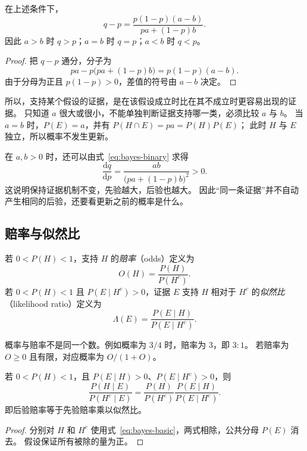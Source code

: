 \documentclass[UTF8,12pt,a4paper,fontset=fandol]{ctexart}
\begin{document}
\begin{proposition}[概率更新的方向]
\label{prop:bayes-direction}
在上述条件下，
\begin{equation}
  q-p=\frac{p(1-p)(a-b)}{pa+(1-p)b}.
  \label{eq:bayes-direction}
\end{equation}
因此 $a>b$ 时 $q>p$；$a=b$ 时 $q=p$；$a<b$ 时 $q<p$。
\end{proposition}
\begin{proof}
把 $q-p$ 通分，分子为
\[
  pa-p\bigl(pa+(1-p)b\bigr)=p(1-p)(a-b).
\]
由于分母为正且 $p(1-p)>0$，差值的符号由 $a-b$ 决定。
\end{proof}

所以，支持某个假设的证据，是在该假设成立时比在其不成立时更容易出现的证据。
只知道 $a$ 很大或很小，不能单独判断证据支持哪一类，必须比较 $a$ 与 $b$。
当 $a=b$ 时，$P(E)=a$，并有 $P(H\cap E)=pa=P(H)P(E)$；
此时 $H$ 与 $E$ 独立，所以概率不发生更新。

在 $a,b>0$ 时，还可以由式~\eqref{eq:bayes-binary} 求得
\[
  \frac{\mathrm dq}{\mathrm dp}
  =\frac{ab}{\bigl(pa+(1-p)b\bigr)^2}>0.
\]
这说明保持证据机制不变，先验越大，后验也越大。
因此“同一条证据”并不自动产生相同的后验，还要看更新之前的概率是什么。

\subsection{赔率与似然比}

\begin{definition}[赔率与似然比]
若 $0<P(H)<1$，支持 $H$ 的\emph{赔率}（odds）定义为
\[
  O(H)=\frac{P(H)}{P(H^c)}.
\]
若 $0<P(H)<1$ 且 $P(E\mid H^c)>0$，证据 $E$ 支持 $H$ 相对于 $H^c$ 的\emph{似然比}（likelihood ratio）定义为
\[
  \Lambda(E)=\frac{P(E\mid H)}{P(E\mid H^c)}.
\]
\end{definition}

概率与赔率不是同一个数。例如概率为 $3/4$ 时，赔率为 $3$，即 $3:1$。
若赔率为 $O\geq0$ 且有限，对应概率为 $O/(1+O)$。

\begin{theorem}[贝叶斯公式的赔率形式]
\label{thm:bayes-odds}
若 $0<P(H)<1$，且 $P(E\mid H)>0$、$P(E\mid H^c)>0$，则
\begin{equation}
  \frac{P(H\mid E)}{P(H^c\mid E)}
  =\frac{P(H)}{P(H^c)}
   \frac{P(E\mid H)}{P(E\mid H^c)}.
  \label{eq:bayes-odds}
\end{equation}
即后验赔率等于先验赔率乘以似然比。
\end{theorem}
\begin{proof}
分别对 $H$ 和 $H^c$ 使用式~\eqref{eq:bayes-basic}，两式相除，公共分母 $P(E)$ 消去。
假设保证所有被除的量为正。
\end{proof}
\end{document}

